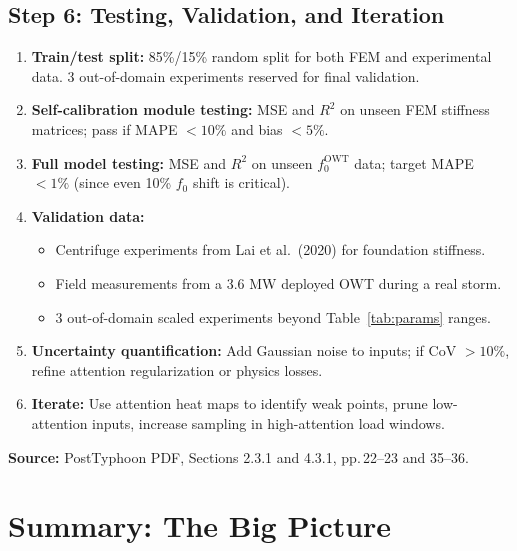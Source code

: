 \documentclass[11pt,a4paper]{article}
\begin{document}
\subsection{Step 6: Testing, Validation, and Iteration}

\begin{enumerate}[noitemsep]
  \item \textbf{Train/test split:} 85\%/15\% random split for both FEM and experimental
        data. 3 out-of-domain experiments reserved for final validation.
  \item \textbf{Self-calibration module testing:} MSE and $R^2$ on unseen FEM stiffness
        matrices; pass if MAPE $< 10\%$ and bias $< 5\%$.
  \item \textbf{Full model testing:} MSE and $R^2$ on unseen $f_0^{\text{OWT}}$ data;
        target MAPE $< 1\%$ (since even 10\% $f_0$ shift is critical).
  \item \textbf{Validation data:}
    \begin{itemize}[noitemsep]
      \item Centrifuge experiments from Lai et al.\ (2020) for foundation stiffness.
      \item Field measurements from a 3.6 MW deployed OWT during a real storm.
      \item 3 out-of-domain scaled experiments beyond Table~\ref{tab:params} ranges.
    \end{itemize}
  \item \textbf{Uncertainty quantification:} Add Gaussian noise to inputs; if CoV $> 10\%$,
        refine attention regularization or physics losses.
  \item \textbf{Iterate:} Use attention heat maps to identify weak points, prune
        low-attention inputs, increase sampling in high-attention load windows.
\end{enumerate}

\textbf{Source:} PostTyphoon PDF, Sections 2.3.1 and 4.3.1, pp.\,22--23 and 35--36.

\section{Summary: The Big Picture}
\end{document}
